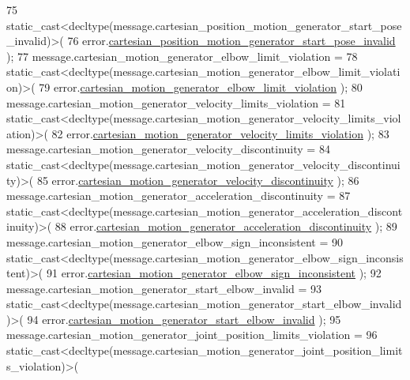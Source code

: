 \begin{DoxyCode}
75       \textcolor{keyword}{static\_cast<}decltype(message.cartesian\_position\_motion\_generator\_start\_pose\_invalid)\textcolor{keyword}{>}(
76           error.\hyperlink{structfranka_1_1Errors_aa910fad4992b91be1ea1c321ee9b7a1e}{cartesian\_position\_motion\_generator\_start\_pose\_invalid}
      );
77   message.cartesian\_motion\_generator\_elbow\_limit\_violation =
78       \textcolor{keyword}{static\_cast<}decltype(message.cartesian\_motion\_generator\_elbow\_limit\_violation)\textcolor{keyword}{>}(
79           error.\hyperlink{structfranka_1_1Errors_ac21ebdc1e0e8fb3099a7dce284550c4c}{cartesian\_motion\_generator\_elbow\_limit\_violation}
      );
80   message.cartesian\_motion\_generator\_velocity\_limits\_violation =
81       \textcolor{keyword}{static\_cast<}decltype(message.cartesian\_motion\_generator\_velocity\_limits\_violation)\textcolor{keyword}{>}(
82           error.\hyperlink{structfranka_1_1Errors_a91437c081452ef708563346b102ba894}{cartesian\_motion\_generator\_velocity\_limits\_violation}
      );
83   message.cartesian\_motion\_generator\_velocity\_discontinuity =
84       \textcolor{keyword}{static\_cast<}decltype(message.cartesian\_motion\_generator\_velocity\_discontinuity)\textcolor{keyword}{>}(
85           error.\hyperlink{structfranka_1_1Errors_a17e4a9b6b7dc4cc12c1328d36cac3eaf}{cartesian\_motion\_generator\_velocity\_discontinuity}
      );
86   message.cartesian\_motion\_generator\_acceleration\_discontinuity =
87       \textcolor{keyword}{static\_cast<}decltype(message.cartesian\_motion\_generator\_acceleration\_discontinuity)\textcolor{keyword}{>}(
88           error.\hyperlink{structfranka_1_1Errors_a10c6ac36bf48b4a9edf91e74d9bc4837}{cartesian\_motion\_generator\_acceleration\_discontinuity}
      );
89   message.cartesian\_motion\_generator\_elbow\_sign\_inconsistent =
90       \textcolor{keyword}{static\_cast<}decltype(message.cartesian\_motion\_generator\_elbow\_sign\_inconsistent)\textcolor{keyword}{>}(
91           error.\hyperlink{structfranka_1_1Errors_a58b0e1199c9dded5a32bfeb110e63037}{cartesian\_motion\_generator\_elbow\_sign\_inconsistent}
      );
92   message.cartesian\_motion\_generator\_start\_elbow\_invalid =
93       \textcolor{keyword}{static\_cast<}decltype(message.cartesian\_motion\_generator\_start\_elbow\_invalid)\textcolor{keyword}{>}(
94           error.\hyperlink{structfranka_1_1Errors_a6d905b803bbe8a7be8490f2a94ba524a}{cartesian\_motion\_generator\_start\_elbow\_invalid}
      );
95   message.cartesian\_motion\_generator\_joint\_position\_limits\_violation =
96       \textcolor{keyword}{static\_cast<}decltype(message.cartesian\_motion\_generator\_joint\_position\_limits\_violation)\textcolor{keyword}{>}(

\end{DoxyCode}
